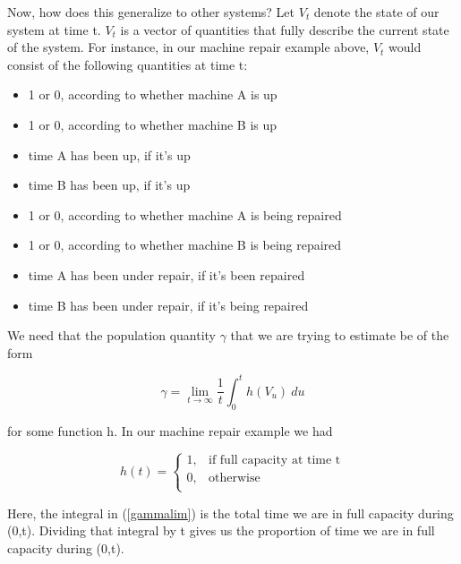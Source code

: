 Now, how does this generalize to other systems?  Let $V_t$ denote the
state of our system at time t.  $V_t$ is a vector of quantities that
fully describe the current state of the system.  For instance, in our
machine repair example above, $V_t$ would consist of the following
quantities at time t:

\begin{itemize}

\item 1 or 0, according to whether machine A is up 

\item 1 or 0, according to whether machine B is up 

\item time A has been up, if it's up

\item time B has been up, if it's up

\item 1 or 0, according to whether machine A is being repaired 

\item 1 or 0, according to whether machine B is being repaired 

\item time A has been under repair, if it's been repaired

\item time B has been under repair, if it's being repaired

\end{itemize}

We need that the population quantity $\gamma$ that we are trying to
estimate be of the form 

\begin{equation}
\label{gammalim}
\gamma = \lim_{t \rightarrow \infty} \frac{1}{t} \int_{0}^{t} h(V_u) ~ du
\end{equation}

for some function h.  In our machine repair example we had

\begin{equation} 
h(t) = \begin{cases} 
   1, & \text{if full capacity at time t} \\ 
   0, & \text{otherwise} \\ 
\end{cases} 
\end{equation}

Here, the integral in (\ref{gammalim}) is the total time we are in full
capacity during (0,t).  Dividing that integral by t gives us the
proportion of time we are in full capacity during (0,t).

